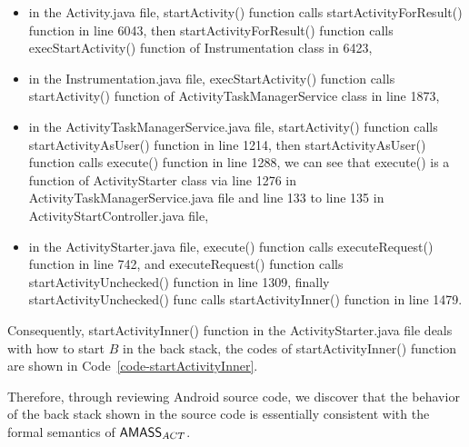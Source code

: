 {%
%
    \begin{itemize}
        \item in the Activity.java file, startActivity() function calls startActivityForResult() function in line 6043, then startActivityForResult() function calls execStartActivity() function of Instrumentation class in 6423,
        \item in the Instrumentation.java file, execStartActivity() function calls startActivity() function of ActivityTaskManagerService class in line 1873,
        \item in the ActivityTaskManagerService.java file, startActivity() function calls startActivityAsUser() function in line 1214, then startActivityAsUser() function calls execute() function in line 1288, we can see that execute() is a function of ActivityStarter class via line 1276 in ActivityTaskManagerService.java file and line 133 to line 135 in ActivityStartController.java file,
        \item in the ActivityStarter.java file, execute() function calls executeRequest() function in line 742, and executeRequest() function calls startActivityUnchecked() function in line 1309, finally startActivityUnchecked() func calls startActivityInner() function in line 1479.
    \end{itemize}
    Consequently, startActivityInner() function in the ActivityStarter.java file deals with how to start $B$ in the back stack, the codes of startActivityInner() function are shown in Code~\ref{code-startActivityInner}.


Therefore, through reviewing Android source code, we discover that the behavior of the back stack shown in the source code is essentially consistent with the formal semantics of $\textsf{AMASS}_{ACT}$.


}
